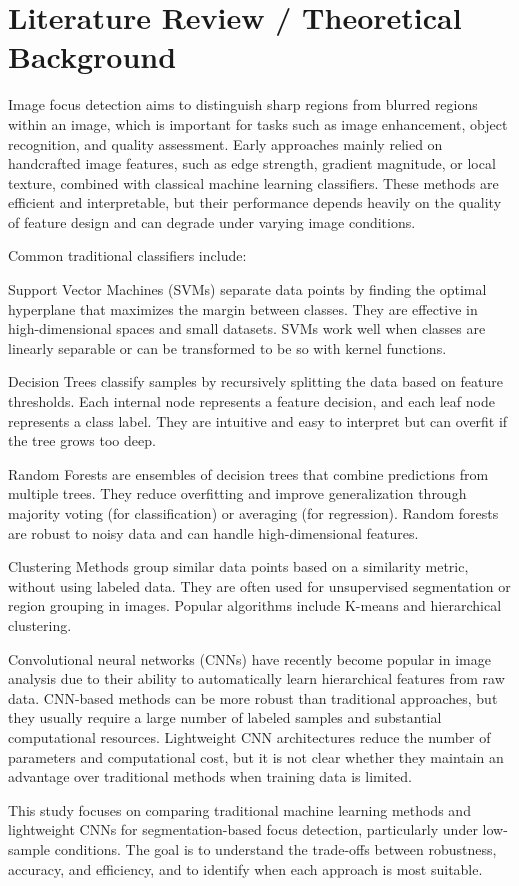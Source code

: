 \section{Literature Review / Theoretical Background}
Image focus detection aims to distinguish sharp regions from blurred regions
within an image, which is important for tasks such as image enhancement, object
recognition, and quality assessment. Early approaches mainly relied on
handcrafted image features, such as edge strength, gradient magnitude, or local
texture, combined with classical machine learning classifiers.\cite{yi2016lbp}
These methods are efficient and interpretable, but their performance depends
heavily on the quality of feature design and can degrade under varying image
conditions.

Common traditional classifiers include\cite{murphy2022pml}:

Support Vector Machines (SVMs) separate data points by finding the optimal
hyperplane that maximizes the margin between classes. They are effective in
high-dimensional spaces and small datasets. SVMs work well when classes are
linearly separable or can be transformed to be so with kernel functions.

Decision Trees classify samples by recursively splitting the data based on
feature thresholds. Each internal node represents a feature decision, and each
leaf node represents a class label. They are intuitive and easy to interpret
but can overfit if the tree grows too deep.

Random Forests are ensembles of decision trees that combine predictions from
multiple trees. They reduce overfitting and improve generalization through
majority voting (for classification) or averaging (for regression). Random
forests are robust to noisy data and can handle high-dimensional features.

Clustering Methods group similar data points based on a similarity metric,
without using labeled data. They are often used for unsupervised segmentation
or region grouping in images. Popular algorithms include K-means and
hierarchical clustering.

Convolutional neural networks (CNNs) have recently become popular in image
analysis due to their ability to automatically learn hierarchical features from
raw data. CNN-based methods can be more robust than traditional approaches, but
they usually require a large number of labeled samples and substantial
computational resources.\cite{zeng2018localmetric} Lightweight CNN
architectures reduce the number of parameters and computational cost, but it is
not clear whether they maintain an advantage over traditional methods when
training data is limited.

This study focuses on comparing traditional machine learning methods and
lightweight CNNs for segmentation-based focus detection, particularly under
low-sample conditions. The goal is to understand the trade-offs between
robustness, accuracy, and efficiency, and to identify when each approach is
most suitable.